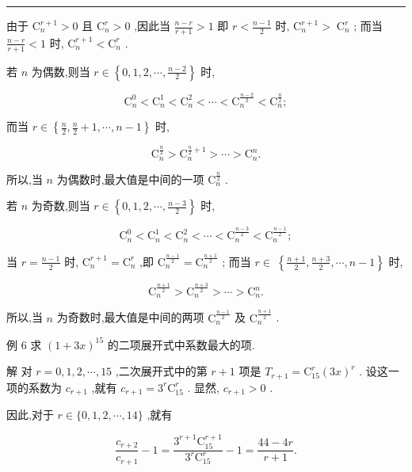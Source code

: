 \documentclass[10pt]{article}
\newcommand{\HRule}{\begin{center}\rule{0.9\linewidth}{0.2mm}\end{center}}
\begin{document}
\HRule

由于 \({\mathrm{C}}_{n}^{r + 1} > 0\) 且 \({\mathrm{C}}_{n}^{r} > 0\) ,因此当 \(\frac{n - r}{r + 1} > 1\) 即 \(r < \frac{n - 1}{2}\) 时, \({\mathrm{C}}_{n}^{r + 1} > \; {\mathrm{C}}_{n}^{r}\) ; 而当 \(\frac{n - r}{r + 1} < 1\) 时, \({\mathrm{C}}_{n}^{r + 1} < {\mathrm{C}}_{n}^{r}\) .

若 \(n\) 为偶数,则当 \(r \in  \left\{  {0,1,2,\cdots ,\frac{n - 2}{2}}\right\}\) 时,

\[
{\mathrm{C}}_{n}^{0} < {\mathrm{C}}_{n}^{1} < {\mathrm{C}}_{n}^{2} < \cdots  < {\mathrm{C}}_{n}^{\frac{n - 2}{2}} < {\mathrm{C}}_{n}^{\frac{n}{2}};
\]

而当 \(r \in  \left\{  {\frac{n}{2},\frac{n}{2} + 1,\cdots ,n - 1}\right\}\) 时,

\[
{\mathrm{C}}_{n}^{\frac{n}{2}} > {\mathrm{C}}_{n}^{\frac{n}{2} + 1} > \cdots  > {\mathrm{C}}_{n}^{n}.
\]

所以,当 \(n\) 为偶数时,最大值是中间的一项 \({\mathrm{C}}_{n}^{\frac{n}{2}}\) .

若 \(n\) 为奇数,则当 \(r \in  \left\{  {0,1,2,\cdots ,\frac{n - 3}{2}}\right\}\) 时,

\[
{\mathrm{C}}_{n}^{0} < {\mathrm{C}}_{n}^{1} < {\mathrm{C}}_{n}^{2} < \cdots  < {\mathrm{C}}_{n}^{\frac{n - 3}{2}} < {\mathrm{C}}_{n}^{\frac{n - 1}{2}};
\]

当 \(r = \frac{n - 1}{2}\) 时, \({\mathrm{C}}_{n}^{r + 1} = {\mathrm{C}}_{n}^{r}\) ,即 \({\mathrm{C}}_{n}^{\frac{n - 1}{2}} = {\mathrm{C}}_{n}^{\frac{n + 1}{2}}\) ; 而当 \(r \in \; \left\{  {\frac{n + 1}{2},\frac{n + 3}{2},\cdots ,n - 1}\right\}\) 时,

\[
{\mathrm{C}}_{n}^{\frac{n + 1}{2}} > {\mathrm{C}}_{n}^{\frac{n + 3}{2}} > \cdots  > {\mathrm{C}}_{n}^{n}.
\]

所以,当 \(n\) 为奇数时,最大值是中间的两项 \({\mathrm{C}}_{n}^{\frac{n - 1}{2}}\) 及 \({\mathrm{C}}_{n}^{\frac{n + 1}{2}}\) .

例 6 求 \({\left( 1 + 3x\right) }^{15}\) 的二项展开式中系数最大的项.

解 对 \(r = 0,1,2,\cdots ,{15}\) ,二次展开式中的第 \(r + 1\) 项是 \({T}_{r + 1} = {\mathrm{C}}_{15}^{r}{\left( 3x\right) }^{r}\) . 设这一项的系数为 \({c}_{r + 1}\) ,就有 \({c}_{r + 1} = {3}^{r}{\mathrm{C}}_{15}^{r}\) . 显然, \({c}_{r + 1} > 0\) .

因此,对于 \(r \in  \{ 0,1,2,\cdots ,{14}\}\) ,就有

\[
\frac{{c}_{r + 2}}{{c}_{r + 1}} - 1 = \frac{{3}^{r + 1}{\mathrm{C}}_{15}^{r + 1}}{{3}^{r}{\mathrm{C}}_{15}^{r}} - 1 = \frac{{44} - {4r}}{r + 1}.
\]
\end{document}
